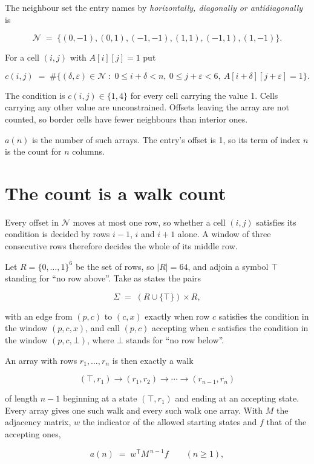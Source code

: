 \documentclass[11pt]{article}
\theoremstyle{definition}
\begin{document}
The neighbour set the entry names by {\itshape horizontally, diagonally or antidiagonally} is

\[\mathcal{N} \;=\; \{(0,-1), (0,1), (-1,-1), (1,1), (-1,1), (1,-1)\}.\]

For a cell $(i,j)$ with $A[i][j] = 1$ put

\[c(i,j) \;=\; \#\bigl\{(\delta,\varepsilon)\in\mathcal{N} \;:\; 0\le i+\delta<n,\ 0\le j+\varepsilon<6,\ A[i+\delta][j+\varepsilon] = 1\bigr\}.\]

The condition is $c(i,j) \in \{1, 4\}$ for every cell carrying the value 1. Cells carrying any other value are unconstrained. Offsets leaving the array are not counted, so border cells have fewer neighbours than interior ones.

$a(n)$ is the number of such arrays. The entry's offset is 1, so its term of index $n$ is the count for $n$ columns.

\section{The count is a walk count}

Every offset in $\mathcal{N}$ moves at most one row, so whether a cell $(i,j)$ satisfies its condition is decided by rows $i-1$, $i$ and $i+1$ alone. A window of three consecutive rows therefore decides the whole of its middle row.

Let $R = \{0,\dots,1\}^{6}$ be the set of rows, so $|R| = 64$, and adjoin a symbol $\top$ standing for ``no row above''. Take as states the pairs

\[\Sigma \;=\; (R \cup \{\top\}) \times R,\]

with an edge from $(p,c)$ to $(c,x)$ exactly when row $c$ satisfies the condition in the window $(p,c,x)$, and call $(p,c)$ accepting when $c$ satisfies the condition in the window $(p,c,\bot)$, where $\bot$ stands for ``no row below''.

An array with rows $r_1,\dots,r_n$ is then exactly a walk

\[(\top,r_1) \to (r_1,r_2) \to \cdots \to (r_{n-1},r_n)\]

of length $n-1$ beginning at a state $(\top,r_1)$ and ending at an accepting state. Every array gives one such walk and every such walk one array. With $M$ the adjacency matrix, $w$ the indicator of the allowed starting states and $f$ that of the accepting ones,

\[a(n) \;=\; w^{\mathsf T} M^{\,n-1} f \qquad (n \ge 1),\]
\end{document}
